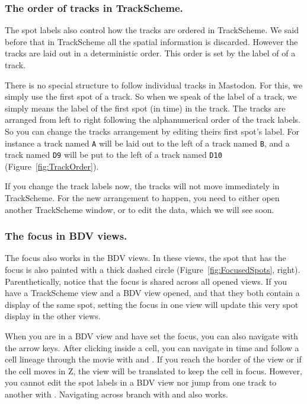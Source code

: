 \subsubsection{The order of tracks in TrackScheme.}

The spot labels also control how the tracks are ordered in TrackScheme.
We said before that in TrackScheme all the spatial information is discarded. 
However the tracks are laid out in a deterministic order.
This order is set by the label of of a track. 

There is no special structure to follow individual tracks in Mastodon. 
For this, we simply use the first spot of a track. 
So when we speak of the label of a track, we simply means the label of the first spot (in time) in the track. 
The tracks are arranged from left to right following the alphanumerical order of the track labels.
So you can change the tracks arrangement by editing theirs first spot's label.
For instance a track named \texttt{A} will be laid out to the left of a track named \texttt{B}, and a track named \texttt{D9} will be put to the left of a track named \texttt{D10} (Figure~\ref{fig:TrackOrder}).

If you change the track labels now, the tracks will not move immediately in TrackScheme.
For the new arrangement to happen, you need to either open another TrackScheme window, or to edit the data, which we will see soon.


\subsubsection{The focus in BDV views.}

The focus also works in the BDV views.
In these views, the spot that has the focus is also painted with a thick dashed circle (Figure~\ref{fig:FocusedSpots}, right).
Parenthetically, notice that the focus is shared across all opened views. 
If you have a TrackScheme view and a BDV view opened, and that they both contain a display of the same spot, setting the focus in one view will update this very spot display in the other views.

When you are in a BDV view and have set the focus, you can also navigate with the arrow keys.
After clicking inside a cell, you can navigate in time and follow a cell lineage through the movie with \keys{\arrowkeyup} and \keys{\arrowkeydown}.
If you reach the border of the view or if the cell moves in Z, the view will be translated to keep the cell in focus.
However, you cannot edit the spot labels in a BDV view nor jump from one track to another with \keys{\arrowkeyleft} \keys{\arrowkeyright}.
Navigating across branch with \keys{\Alt+\arrowkeyup} and \keys{\Alt+\arrowkeydown} \etc also works.


